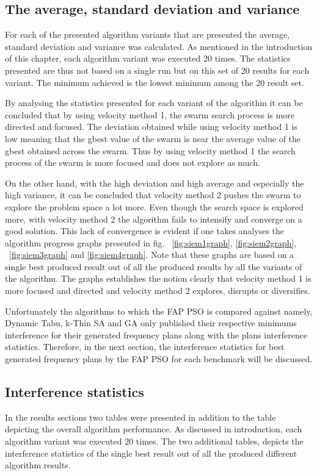 \subsection{The average, standard deviation and variance}
For each of the presented algorithm variants that are presented the average, standard deviation and variance was calculated. As mentioned in the introduction of this chapter, each algorithm variant was executed 20 times. The statistics presented are thus not based on a single run but on this set of 20 results for each variant. The minimum achieved is the lowest minimum among the 20 result set.

By analysing the statistics presented for each variant of the algorithm it can be concluded that by using velocity method 1, the swarm search process is more directed and focused. The deviation obtained while using velocity method 1 is low meaning that the gbest value of the swarm is near the average value of the gbest obtained across the swarm. Thus by using velocity method 1 the search process of the swarm is more focused and does not explore as much.

On the other hand, with the high deviation and high average and especially the high variance, it can be concluded that velocity method 2 pushes the swarm to explore the problem space a lot more. Even though the search space is explored more, with velocity method 2 the algorithm fails to intensify and converge on a good solution. This lack of convergence is evident if one takes analyses the algorithm progress graphs presented in fig. ~\ref{fig:siem1graph}, \ref{fig:siem2graph}, ~\ref{fig:siem3graph} and \ref{fig:siem4graph}. Note that these graphs are based on a single best produced result out of all the produced results by all the variants of the algorithm. The graphs establishes the notion clearly that velocity method 1 is more focused and directed and velocity method 2 explores, disrupts or diversifies.

Unfortunately the algorithms to which the FAP PSO is compared against namely, Dynamic Tabu, k-Thin SA and GA only published their respective minimums interference for their generated frequency plans along with the plans interference statistics. Therefore, in the next section, the interference statistics for best generated frequency plans by the FAP PSO for each benchmark will be discussed.

\subsection{Interference statistics}
In the results sections two tables were presented in addition to the table depicting the overall algorithm performance. As discussed in introduction, each algorithm variant was executed 20 times. The two additional tables, depicts the interference statistics of the single best result out of all the produced different algorithm results.

